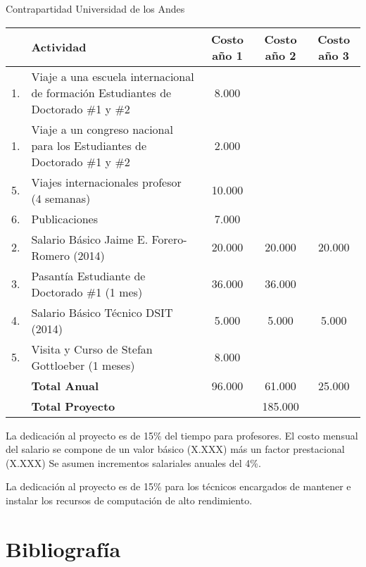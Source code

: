 \documentclass[12pt]{article}
\begin{document}
Contrapartidad Universidad de los Andes


\begin{tabular}{|l |p{4.5cm}| c |c |c|}\hline
& Actividad & Costo a\~no 1 & Costo a\~no 2 & Costo a\~no 3\\\hline
1. & Viaje a una escuela internacional de formaci\'on Estudiantes de
Doctorado \#1 y \#2 & 8.000 & & \\\hline
1. & Viaje a un congreso nacional para los Estudiantes de
Doctorado \#1 y \#2 & 2.000 & & \\\hline
5. & Viajes internacionales profesor (4 semanas) & 10.000 & & \\ \hline
6. & Publicaciones &  7.000 & & \\\hline 
2. & Salario B\'asico Jaime E. Forero-Romero (2014) & 20.000 & 20.000
& 20.000 \\\hline  

3. & Pasant\'ia Estudiante de Doctorado \#1 (1 mes) & 36.000 &
36.000 & \\\hline

4. & Salario B\'asico T\'ecnico DSIT (2014) & 5.000 & 5.000
& 5.000 \\\hline  

5. & Visita y Curso de Stefan Gottloeber (1 meses) & 8.000 & & \\\hline

& {\bf Total Anual} & 96.000 & 61.000 & 25.000\\\hline
& {{\bf Total Proyecto}} & \multicolumn{3}{|c|}{185.000}\\\hline

\end{tabular} 

La dedicaci\'on al proyecto es de 15\% del tiempo para
profesores. El costo mensual del salario se compone de un valor
b\'asico (X.XXX) m\'as un factor prestacional (X.XXX) Se asumen
incrementos salariales anuales del 4\%. 

La dedicaci\'on al proyecto es de 15\% para los t\'ecnicos encargados
de mantener e instalar los recursos de computaci\'on de alto
rendimiento. 


\section{Bibliograf\'ia}

{}

\end{document}
